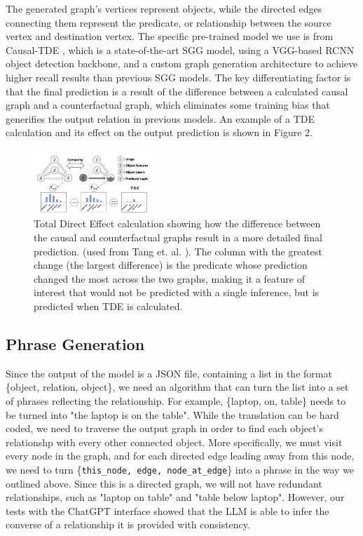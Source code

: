 \documentclass[letterpaper, 10 pt, conference]{ieeeconf}  %
\begin{document}
        The generated graph's vertices represent objects, while the directed edges connecting them represent the predicate, or relationship between the source vertex and destination vertex. The specific pre-trained model we use is from Causal-TDE \cite{tang2020sggcode}, which is a state-of-the-art SGG model, using a VGG-based RCNN object detection backbone, and a custom graph generation architecture to achieve higher recall results than previous SGG models. The key differentiating factor is that the final prediction is a result of the difference between a calculated causal graph and a counterfactual graph, which eliminates some training bias that generifies the output relation in previous models. An example of a TDE calculation and its effect on the output prediction is shown in Figure 2.

        \begin{figure}
            \centering
            \includegraphics[width=0.4\textwidth]{images/counterfactual.png}
            \caption{Total Direct Effect calculation showing how the difference between the causal and counterfactual graphs result in a more detailed final prediction. (used from Tang et. al. \cite{tang2020unbiased}). The column with the greatest change (the largest difference) is the predicate whose prediction changed the most across the two graphs, making it a feature of interest that would not be predicted with a single inference, but is predicted when TDE is calculated.}
            \label{fig:counterfactual}
        \end{figure}


    
    \subsection*{Phrase Generation}
        Since the output of the model is a JSON file, containing a list in the format \{object, relation, object\}, we need an algorithm that can turn the list into a set of phrases reflecting the relationship. For example, \{laptop, on, table\} needs to be turned into "the laptop is on the table". While the translation can be hard coded, we need to traverse the output graph in order to find each object's relationshp with every other connected object. More specifically, we must visit every node in the graph, and for each directed edge leading away from this node, we need to turn \{\texttt{this\_node, edge, node\_at\_edge}\} into a phrase in the way we outlined above. Since this is a directed graph, we will not have redundant relationships, such as "laptop on table" and "table below laptop". However, our tests with the ChatGPT interface showed that the LLM is able to infer the converse of a relationship it is provided with consistency.
    
\end{document}
